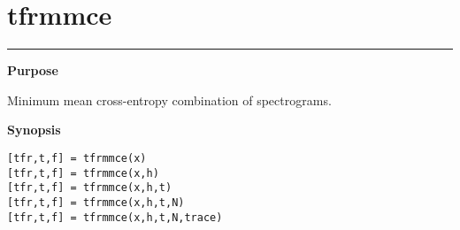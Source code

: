 

\section*{\hspace*{-1.6cm} tfrmmce}

\vspace*{-.4cm}
\hspace*{-1.6cm}\rule[0in]{16.5cm}{.02cm}
\vspace*{.2cm}

{\bf \large \sf Purpose}\\
\hspace*{1.5cm}
\begin{minipage}[t]{13.5cm}
Minimum mean cross-entropy combination of spectrograms.
\end{minipage}
\vspace*{.5cm}

{\bf \large \sf Synopsis}\\
\hspace*{1.5cm}
\begin{minipage}[t]{13.5cm}
\begin{verbatim}
[tfr,t,f] = tfrmmce(x)
[tfr,t,f] = tfrmmce(x,h)
[tfr,t,f] = tfrmmce(x,h,t)
[tfr,t,f] = tfrmmce(x,h,t,N)
[tfr,t,f] = tfrmmce(x,h,t,N,trace)
\end{verbatim}
\end{minipage}
\vspace*{.5cm}

